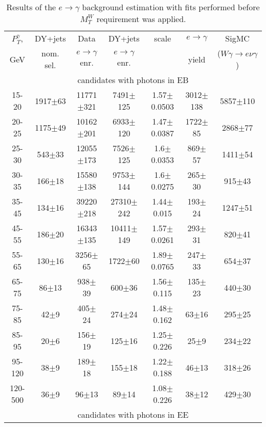 \begin{table}[h]
  \scriptsize
  \begin{center}
  \caption{Results of the $e\rightarrow\gamma$ background estimation with fits performed before $M_T^W$ requirement was applied. } 
   \begin{tabular}{|c|c|c|c|c|c|c|}
\hline
 $P_T^{\gamma}$,  & DY+jets    & Data                      & DY+jets & scale & $e\rightarrow\gamma$ & SigMC\\ 
 GeV & nom. sel. & $e\rightarrow\gamma$ enr. & $e\rightarrow\gamma$ enr. & & yield & ($W\gamma\rightarrow e\nu\gamma$)\\ \hline
 \multicolumn{7}{|c|}{candidates with photons in EB}\\ 
15-20 & 1917$\pm$63 & 11771$\pm$321 & 7491$\pm$125 & 1.57$\pm$0.0503& 3012$\pm$138& 5857$\pm$110 \\ \hline
20-25 & 1175$\pm$49 & 10162$\pm$201 & 6933$\pm$120 & 1.47$\pm$0.0387& 1722$\pm$85& 2868$\pm$77 \\ \hline
25-30 & 543$\pm$33 & 12055$\pm$173 & 7526$\pm$125 & 1.6$\pm$0.0353& 869$\pm$57& 1411$\pm$54 \\ \hline
30-35 & 166$\pm$18 & 15580$\pm$138 & 9753$\pm$144 & 1.6$\pm$0.0275& 265$\pm$30& 915$\pm$43 \\ \hline
35-45 & 134$\pm$16 & 39220$\pm$218 & 27310$\pm$242 & 1.44$\pm$0.015& 193$\pm$24& 1247$\pm$51 \\ \hline
45-55 & 186$\pm$20 & 16343$\pm$135 & 10411$\pm$149 & 1.57$\pm$0.0261& 293$\pm$31& 820$\pm$41 \\ \hline
55-65 & 130$\pm$16 & 3256$\pm$65 & 1722$\pm$60 & 1.89$\pm$0.0765& 247$\pm$33& 654$\pm$37 \\ \hline
65-75 & 86$\pm$13 & 938$\pm$39 & 600$\pm$36 & 1.56$\pm$0.115& 135$\pm$23& 440$\pm$30 \\ \hline
75-85 & 42$\pm$9 & 405$\pm$24 & 274$\pm$24 & 1.48$\pm$0.162& 63$\pm$16& 295$\pm$25 \\ \hline
85-95 & 20$\pm$6 & 156$\pm$19 & 125$\pm$16 & 1.25$\pm$0.226& 25$\pm$9& 234$\pm$22 \\ \hline
95-120 & 38$\pm$9 & 189$\pm$18 & 155$\pm$18 & 1.22$\pm$0.188& 46$\pm$13& 318$\pm$26 \\ \hline
120-500 & 36$\pm$9 & 96$\pm$13 & 89$\pm$14 & 1.08$\pm$0.226& 38$\pm$12& 429$\pm$30 \\ \hline
\multicolumn{7}{|c|}{candidates with photons in EE}\\ 

\end{tabular}
\end{center}
\end{table}

